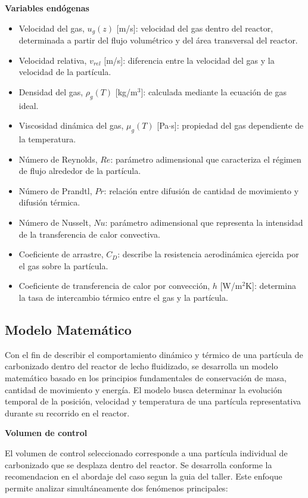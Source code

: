 \documentclass[11pt,stdletter,orderfromtodate,sigleft,twoside]{report}
\begin{document}
\textbf{Variables endógenas} 

\begin{itemize}
\item Velocidad del gas, $u_g(z)$ [m/s]: velocidad del gas dentro del reactor, determinada a partir del flujo volumétrico y del área transversal del reactor.
\item Velocidad relativa, $v_{rel}$ [m/s]: diferencia entre la velocidad del gas y la velocidad de la partícula.
\item Densidad del gas, $\rho_g(T)$ [kg/m$^3$]: calculada mediante la ecuación de gas ideal.
\item Viscosidad dinámica del gas, $\mu_g(T)$ [Pa$\cdot$s]: propiedad del gas dependiente de la temperatura.
\item Número de Reynolds, $Re$: parámetro adimensional que caracteriza el régimen de flujo alrededor de la partícula.
\item Número de Prandtl, $Pr$: relación entre difusión de cantidad de movimiento y difusión térmica.
\item Número de Nusselt, $Nu$: parámetro adimensional que representa la intensidad de la transferencia de calor convectiva.
\item Coeficiente de arrastre, $C_D$: describe la resistencia aerodinámica ejercida por el gas sobre la partícula.
\item Coeficiente de transferencia de calor por convección, $h$ [W/m$^2$K]: determina la tasa de intercambio térmico entre el gas y la partícula.
\end{itemize}
\medskip

\medskip

\subsection{Modelo Matem\'atico}

Con el fin de describir el comportamiento dinámico y térmico de una partícula de carbonizado dentro del reactor de lecho fluidizado, se desarrolla un modelo matemático basado en los principios fundamentales de conservación de masa, cantidad de movimiento y energía. El modelo busca determinar la evolución temporal de la posición, velocidad y temperatura de una partícula representativa durante su recorrido en el reactor.
\medskip


\textbf{Volumen de control}

El volumen de control seleccionado corresponde a una partícula individual de carbonizado que se desplaza dentro del reactor. Se desarrolla conforme la recomendacion en el abordaje del caso segun la guia del taller. Este enfoque permite analizar simultáneamente dos fenómenos principales:
\end{document}
